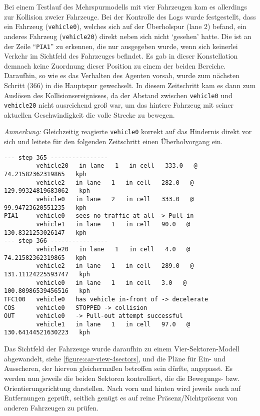 Bei einem Testlauf des Mehrspurmodells mit vier Fahrzeugen kam es allerdings zur Kollision zweier Fahrzeuge. 
Bei der Kontrolle des Logs wurde festgestellt, dass ein Fahrzeug (\texttt{vehicle0}), welches sich auf der Überholspur (lane 2) befand, ein anderes Fahrzeug (\texttt{vehicle20}) direkt neben sich nicht \enquote*{gesehen} hatte. 
Die ist an der Zeile \enquote{\texttt{PIA1}} zu erkennen, die nur ausgegeben wurde, wenn sich keinerlei Verkehr im Sichtfeld des Fahrzeuges befindet.
Es gab in dieser Konstellation demnach keine Zuordnung dieser Position zu einem der beiden Bereiche.
Daraufhin, so wie es das Verhalten des Agenten vorsah, wurde zum nächsten Schritt (366) in die Hauptspur gewechselt. 
In diesem Zeitschritt kam es dann zum Auslösen des Kollisionsereignisses, da der Abstand zwischen \texttt{vehicle0} und \texttt{vehicle20} nicht ausreichend groß war, um das hintere Fahrzeug mit seiner aktuellen Geschwindigkeit die volle Strecke zu bewegen.

\textit{Anmerkung:} Gleichzeitig reagierte \texttt{vehicle0} korrekt auf das Hindernis direkt vor sich und leitete für den folgenden Zeitschritt einen Überholvorgang ein.

\footnotesize\begin{verbatim}
--- step 365 ----------------
         vehicle20   in lane   1   in cell   333.0   @   74.21582362319865   kph
         vehicle2   in lane   1   in cell   282.0   @   129.99324819683062   kph
         vehicle0   in lane   2   in cell   333.0   @   99.94723620551235   kph
PIA1     vehicle0   sees no traffic at all -> Pull-in
         vehicle1   in lane   1   in cell   90.0   @   130.8321253026147   kph
--- step 366 ----------------
         vehicle20   in lane   1   in cell   4.0   @   74.21582362319865   kph
         vehicle2   in lane   1   in cell   289.0   @   131.11124225593747   kph
         vehicle0   in lane   1   in cell   3.0   @   100.80986539456516   kph
TFC100   vehicle0   has vehicle in-front of -> decelerate
COS      vehicle0   STOPPED -> collision
OUT      vehicle0   -> Pull-out attempt successful
         vehicle1   in lane   1   in cell   97.0   @   130.64144521630223   kph
\end{verbatim}
\normalsize

Das Sichtfeld der Fahrzeuge wurde daraufhin zu einem Vier-Sektoren-Modell abgewandelt, siehe \cref{figure:car-view-4sectors}, und die Pläne für Ein- und Ausscheren, der hiervon gleichermaßen betroffen sein dürfte, angepasst.
Es werden nun jeweils die beiden Sektoren kontrolliert, die die Bewegungs- bzw. Orientierungsrichtung darstellen. 
Nach vorn und hinten wird jeweils auch auf Entfernungen geprüft, seitlich genügt es auf reine Präsenz/Nichtpräsenz von anderen Fahrzeugen zu prüfen.


